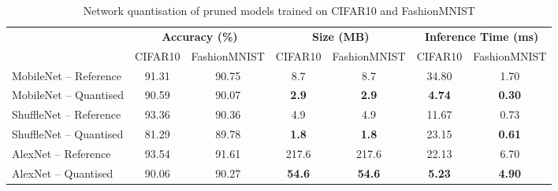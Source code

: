 \documentclass[conference]{IEEEtran}
\begin{document}
\begin{table*}[t]
    \centering
    \caption{Network quantisation of pruned models trained on CIFAR10 and FashionMNIST}
    \begin{tabular}{@{\extracolsep{4pt}}lcccccc}
        \toprule
        
        \multicolumn{1}{c}{\multirow{2}{*}{\raisebox{-\heavyrulewidth}{\textbf{Network}}}} & \multicolumn{2}{c}{\textbf{Accuracy (\%)}} & \multicolumn{2}{c}{\textbf{Size (MB)}} & \multicolumn{2}{c}{\textbf{Inference Time (ms)}} \\
        \cmidrule{2-3}
        \cmidrule{4-5}
        \cmidrule{6-7}
        {} & CIFAR10 & FashionMNIST & CIFAR10 & FashionMNIST & CIFAR10 & FashionMNIST \\ 
        \midrule
        MobileNet -- Reference  & 91.31 & 90.75 & 8.7 & 8.7 & 34.80 & 1.70 \\
        MobileNet -- Quantised  & 90.59 & 90.07 & \textbf{2.9} & \textbf{2.9} & \textbf{4.74} & \textbf{0.30} \\
        \midrule
        ShuffleNet -- Reference & 93.36 & 90.36 & 4.9 & 4.9 & 11.67 & 0.73 \\
        ShuffleNet -- Quantised & 81.29 & 89.78 & \textbf{1.8} & \textbf{1.8} & 23.15 & \textbf{0.61} \\
        \midrule
        AlexNet -- Reference    & 93.54 & 91.61 & 217.6 & 217.6   & 22.13 & 6.70 \\
        AlexNet -- Quantised    & 90.06 & 90.27 & \textbf{54.6} & \textbf{54.6} & \textbf{5.23} & \textbf{4.90} \\
        \bottomrule
    \end{tabular}
    \label{table:quantised}
\end{table*}
\end{document}
